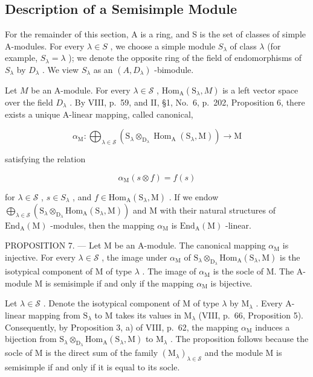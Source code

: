 \subsection{Description of a Semisimple Module}

For the remainder of this section, A is a ring, and S is the set of classes of simple A-modules. For every \(\lambda \in S\) , we choose a simple module \(S_{\lambda}\) of class \(\lambda\) (for example, \(S_{\lambda} = \lambda\) ); we denote the opposite ring of the field of endomorphisms of \(S_{\lambda}\) by \(D_{\lambda}\) . We view \(S_{\lambda}\) as an \((A, D_{\lambda})\) -bimodule.

Let \(M\) be an A-module. For every \(\lambda \in \mathcal{S}\) , \(\mathrm{Hom}_{\mathrm{A}}(\mathrm{S}_{\lambda}, M)\) is a left vector space over the field \(D_{\lambda}\) . By VIII, p.~59, and II, §1, No.~6, p.~202, Proposition 6, there exists a unique A-linear mapping, called canonical,

\[
\alpha_ {\mathrm{M}}: \bigoplus_ {\lambda \in \mathcal {S}} \left(\mathrm{S} _ {\lambda} \otimes_ {\mathrm{D} _ {\lambda}} \operatorname{Hom} _ {\mathrm{A}} (\mathrm{S} _ {\lambda}, \mathrm{M})\right) \to \mathrm{M}
\]

satisfying the relation

\[
\alpha_ {\mathrm{M}} (s \otimes f) = f (s)\tag{10}
\]

for \(\lambda \in \mathcal{S}\) , \(s \in S_{\lambda}\) , and \(f \in \mathrm{Hom}_{\mathrm{A}}(\mathrm{S}_{\lambda}, \mathrm{M})\) . If we endow \(\bigoplus_{\lambda \in \mathcal{S}} (\mathrm{S}_{\lambda} \otimes_{\mathrm{D}_{\lambda}} \mathrm{Hom}_{\mathrm{A}}(\mathrm{S}_{\lambda}, \mathrm{M}))\) and \(\mathrm{M}\) with their natural structures of \(\mathrm{End}_{\mathrm{A}}(\mathrm{M})\) -modules, then the mapping \(\alpha_{\mathrm{M}}\) is \(\mathrm{End}_{\mathrm{A}}(\mathrm{M})\) -linear.

PROPOSITION 7. --- Let M be an A-module. The canonical mapping \(\alpha_{\mathrm{M}}\) is injective. For every \(\lambda \in \mathcal{S}\) , the image under \(\alpha_{\mathrm{M}}\) of \(\mathrm{S}_{\lambda} \otimes_{\mathrm{D}_{\lambda}} \mathrm{Hom}_{\mathrm{A}}(\mathrm{S}_{\lambda}, \mathrm{M})\) is the isotypical component of M of type \(\lambda\) . The image of \(\alpha_{\mathrm{M}}\) is the socle of M. The A-module M is semisimple if and only if the mapping \(\alpha_{\mathrm{M}}\) is bijective.

Let \(\lambda \in \mathcal{S}\) . Denote the isotypical component of M of type \(\lambda\) by \(\mathrm{M}_{\lambda}\) . Every A-linear mapping from \(\mathrm{S}_{\lambda}\) to M takes its values in \(\mathrm{M}_{\lambda}\) (VIII, p.~66, Proposition 5). Consequently, by Proposition 3, a) of VIII, p.~62, the mapping \(\alpha_{\mathrm{M}}\) induces a bijection from \(\mathrm{S}_{\lambda} \otimes_{\mathrm{D}_{\lambda}} \mathrm{Hom}_{\mathrm{A}}(\mathrm{S}_{\lambda}, \mathrm{M})\) to \(\mathrm{M}_{\lambda}\) . The proposition follows because the socle of M is the direct sum of the family \((\mathrm{M}_{\lambda})_{\lambda \in \mathcal{S}}\) and the module M is semisimple if and only if it is equal to its socle.

